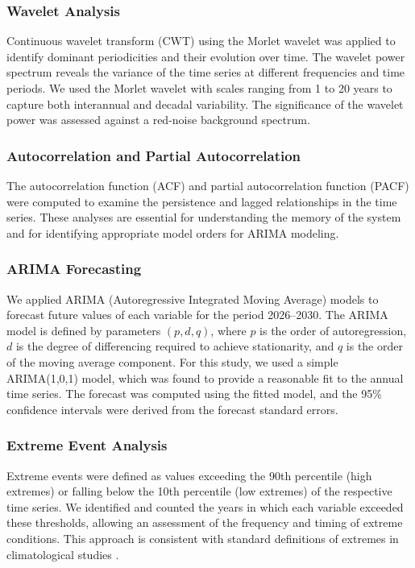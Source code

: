 \documentclass[12pt,a4paper]{article}
\begin{document}
\subsubsection{Wavelet Analysis}
Continuous wavelet transform (CWT) using the Morlet wavelet \citep{torrence1998} was applied to identify dominant periodicities and their evolution over time. The wavelet power spectrum reveals the variance of the time series at different frequencies and time periods. We used the Morlet wavelet with scales ranging from 1 to 20 years to capture both interannual and decadal variability. The significance of the wavelet power was assessed against a red-noise background spectrum.

\subsubsection{Autocorrelation and Partial Autocorrelation}
The autocorrelation function (ACF) and partial autocorrelation function (PACF) were computed to examine the persistence and lagged relationships in the time series. These analyses are essential for understanding the memory of the system and for identifying appropriate model orders for ARIMA modeling.

\subsubsection{ARIMA Forecasting}
We applied ARIMA (Autoregressive Integrated Moving Average) models \citep{box1976} to forecast future values of each variable for the period 2026–2030. The ARIMA model is defined by parameters $(p, d, q)$, where $p$ is the order of autoregression, $d$ is the degree of differencing required to achieve stationarity, and $q$ is the order of the moving average component. For this study, we used a simple ARIMA(1,0,1) model, which was found to provide a reasonable fit to the annual time series. The forecast was computed using the fitted model, and the 95\% confidence intervals were derived from the forecast standard errors.

\subsubsection{Extreme Event Analysis}
Extreme events were defined as values exceeding the 90th percentile (high extremes) or falling below the 10th percentile (low extremes) of the respective time series. We identified and counted the years in which each variable exceeded these thresholds, allowing an assessment of the frequency and timing of extreme conditions. This approach is consistent with standard definitions of extremes in climatological studies \citep{zhang2011}.
\end{document}
